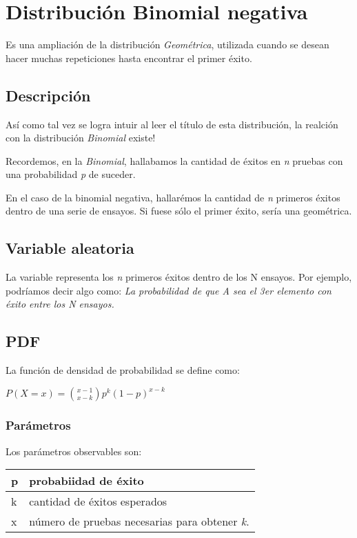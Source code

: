 \chapter{Distribución Binomial negativa}

Es una ampliación de la distribución \textit{Geométrica}, utilizada cuando se desean hacer muchas repeticiones hasta encontrar el primer éxito.

\section{Descripción}
Así como tal vez se logra intuir al leer el título de esta distribución, la realción con la distribución \textit{Binomial} existe!

Recordemos, en la \textit{Binomial}, hallabamos la cantidad de éxitos en \textit{n} pruebas con una probabilidad \textit{p} de suceder. \cite{bn:1}

En el caso de la binomial negativa, hallarémos la cantidad de \textit{n} primeros éxitos dentro de una serie de ensayos. Si fuese sólo el primer éxito, sería una geométrica.

\section{Variable aleatoria}
La variable representa los \textit{n} primeros éxitos dentro de los N ensayos. Por ejemplo, podríamos decir algo como: \textit{La probabilidad de que A sea el 3er elemento con éxito entre los N ensayos.}


\section{PDF}
La función de densidad de probabilidad se define como: \\
\begin{center}
$P(X= \textit{x}) = { x - 1 \choose x - k} {p^k} ({1-p})^{x-k}  $
\end{center}

\subsection{Parámetros}
Los parámetros observables son:

\begin{center}
	\begin{tabular} {| l | l |}
		\hline
		p & probabiidad de éxito\\ \hline
		k & cantidad de éxitos esperados\\ \hline		
		x & número de pruebas necesarias para obtener \textit{k}. \\ \hline
	\end{tabular}
\end{center}


